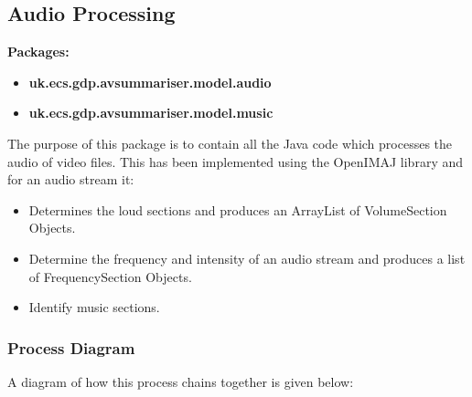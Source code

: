 \newpage

\newpage
\subsection{Audio Processing}
\label{sec:AudioProcessing}

\textbf{Packages:}
\begin{itemize}
	\item{\textbf{uk.ecs.gdp.avsummariser.model.audio}}
	\item{\textbf{uk.ecs.gdp.avsummariser.model.music}}
\end{itemize}

The purpose of this package is to contain all the Java code which processes the audio of video files. This has been implemented using the OpenIMAJ 
library \cite{citeOpenImaj} and for an audio stream it:
\begin{itemize}
	\item{Determines the loud sections and produces an ArrayList of VolumeSection Objects.}
	\item{Determine the frequency and intensity of an audio stream and produces a list of FrequencySection Objects.}
	\item{Identify music sections.}
\end{itemize}

\subsubsection{Process Diagram}
A diagram of how this process chains together is given below:

